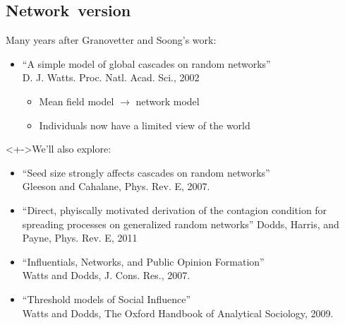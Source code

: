 




\subsection{Network\ version}

\begin{frame}

  \small
  \begin{block}{Many years after Granovetter and Soong's work:}
    \begin{itemize}
    \item<+-> 
      ``A simple model of global cascades on random networks''\\      
      D. J. Watts.  Proc. Natl. Acad. Sci., 2002\cite{watts2002a}
      \begin{itemize}
      \item<+-> 
        Mean field model $\rightarrow$ network model
      \item<+-> 
        Individuals now have a limited view of the world
      \end{itemize}
    \end{itemize}
  \end{block}

  \begin{block}<+->{We'll also explore:}
    \begin{itemize}
    \item 
      ``Seed size strongly affects cascades on random networks''\cite{gleeson2007a}\\
      Gleeson and Cahalane, Phys. Rev. E, 2007.
    \item
      ``Direct, phyiscally motivated derivation of the contagion condition for spreading processes on generalized random networks''\cite{dodds2011b}
      Dodds, Harris, and Payne, Phys. Rev. E, 2011
    \item 
      ``Influentials, Networks, and Public Opinion Formation''\cite{watts2007a}\\
      Watts and Dodds, J. Cons. Res., 2007.
    \item 
      ``Threshold models of Social Influence''\cite{watts2009a}\\
      Watts and Dodds, The Oxford Handbook of Analytical Sociology, 2009.
    \end{itemize}
  \end{block}


\end{frame}

